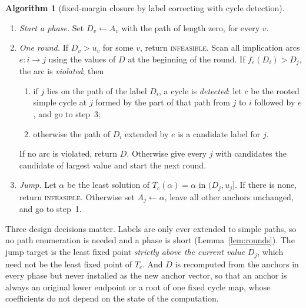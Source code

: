 \documentclass[11pt,a4paper]{article}
\theoremstyle{plain}
\theoremstyle{definition}
\theoremstyle{remark}
\newcommand{\INF}{\textnormal{\textsc{infeasible}}}
\begin{document}
\medskip
\noindent\textbf{Algorithm 1} (fixed-margin closure by label correcting with cycle detection).
\begin{enumerate}[label=\arabic*.]
\item \emph{Start a phase.} Set $D_v\leftarrow A_v$ with the path of length zero, for every $v$.
\item \emph{One round.} If $D_v>u_v$ for some $v$, return \INF. Scan all implication arcs $e\colon i\to j$ using the values of $D$ at the beginning of the round. If $f_e(D_i)>D_j$, the arc is \emph{violated}; then
 \begin{enumerate}[label=(\alph*)]
 \item if $j$ lies on the path of the label $D_i$, a cycle is \emph{detected}: let $c$ be the rooted simple cycle at $j$ formed by the part of that path from $j$ to $i$ followed by $e$, and go to step~3;
 \item otherwise the path of $D_i$ extended by $e$ is a candidate label for $j$.
 \end{enumerate}
 If no arc is violated, return $D$. Otherwise give every $j$ with candidates the candidate of largest value and start the next round.
\item \emph{Jump.} Let $\alpha$ be the least solution of $T_c(\alpha)=\alpha$ in $(D_j,u_j]$. If there is none, return \INF. Otherwise set $A_j\leftarrow\alpha$, leave all other anchors unchanged, and go to step~1.
\end{enumerate}

\noindent Three design decisions matter. Labels are only ever extended to simple paths, so no path enumeration is needed and a phase is short (Lemma~\ref{lem:rounds}). The jump target is the least fixed point \emph{strictly above the current value} $D_j$, which need not be the least fixed point of $T_c$. And $D$ is recomputed from the anchors in every phase but never installed as the new anchor vector, so that an anchor is always an original lower endpoint or a root of one fixed cycle map, whose coefficients do not depend on the state of the computation.
\end{document}
